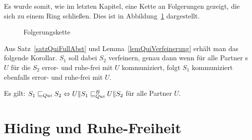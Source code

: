 Es wurde somit, wie im letzten Kapitel, eine Kette an Folgerungen gezeigt, die
sich zu einem Ring schließen. Dies ist in Abbildung~\ref{FolgerungsketteQui}
dargestellt.

\begin{figure}[h!tbp]
  \begin{center}
    \caption{Folgerungskette}
    \label{FolgerungsketteQui}
  \end{center}
\end{figure}

Aus Satz~\ref{satzQuiFullAbst} und Lemma~\ref{lemQuiVerfeinerung} erhält man
das folgende Korollar. $S_1$ soll dabei $S_2$ verfeinern, genau dann wenn für
alle Partner \EIO{}s $U$ für die $S_2$ error- und ruhe-frei mit $U$
kommuniziert, folgt $S_1$ kommuniziert ebenfalls error- und ruhe-frei mit $U$.

\begin{kor}
  Es gilt: $S_1\sqsubseteq _{Qui} S_2\Leftrightarrow U\|S_1\sqsubseteq _{Qui}^B U\|S_2$ für alle Partner
  $U$.
\end{kor}

\section{Hiding und Ruhe-Freiheit}

